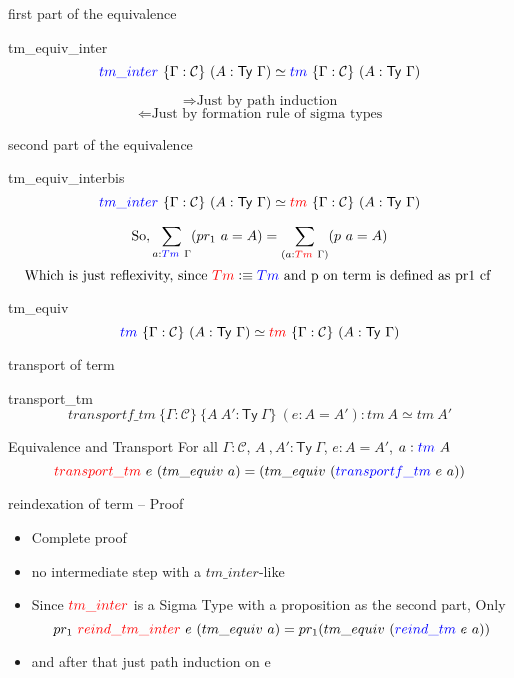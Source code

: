 \documentclass[
  ignorenonframetext,
  aspectratio=169,
  usenames,
  dvipsnames
]{beamer}
\newcommand{\constfont}[1]{\ensuremath{\mathsf{#1}}}
\newcommand{\CC}{{\mathcal{C}}}
\newcommand{\Ty}{\constfont{Ty}}
\newcommand{\rl}[1]{\color{red}#1\color{black}}
\newcommand{\bl}[1]{\color{blue}#1\color{black}}
\newcommand{\defeq}{\vcentcolon\equiv}
\begin{document}
\begin{frame}{first part of the equivalence}
  \begin{block}{tm\_equiv\_inter}
    $$\bl{tm\_inter}\ \{\Gamma : \CC\}\ (A : \Ty\ \Gamma) \simeq \bl{tm}\ \{\Gamma : \CC\}\ (A : \Ty\ \Gamma)$$
  \end{block}
  $$\Rightarrow \text{Just by path induction}$$
  $$\Leftarrow \text{Just by formation rule of sigma types}$$
\end{frame}
\begin{frame}{second part of the equivalence}
  \begin{block}{tm\_equiv\_interbis}
    $$\bl{tm\_inter}\ \{\Gamma : \CC\}\ (A : \Ty\ \Gamma) \simeq \rl{tm}\ \{\Gamma : \CC\}\ (A : \Ty\ \Gamma)$$
  \end{block}
  $$\text{So}, \sum_{a: \bl{Tm}\ \Gamma} (pr_1\ a = A) = \sum_{(a : \rl{Tm}\ \Gamma)} (p\ a = A) $$
  $$\text{Which is just reflexivity, since } \rl{Tm} \defeq \bl{Tm} \text{ and p on term is defined as pr1 cf } $$ 
  \begin{block}{tm\_equiv}
    $$\bl{tm}\ \{\Gamma : \CC\}\ (A : \Ty\ \Gamma) \simeq \rl{tm}\ \{\Gamma : \CC\}\ (A : \Ty\ \Gamma)$$
  \end{block}
\end{frame}

\begin{frame}{transport of term}
  \begin{block}{transport\_tm}
  $$transportf\_tm\ \{\Gamma :\CC\}\ \{A\ A': \Ty\ \Gamma\}\ (e  : A = A') : tm\ A \simeq tm\ A'$$
  \end{block}
  \begin{block}{Equivalence and Transport}
  For all $\Gamma : \CC$, $A\ ,A' : \Ty\ \Gamma$, $e : A = A'$, $a : \bl{tm}\ A$
  $$ \rl{transport\_tm}\ e\ (tm\_equiv\ a) = (tm\_equiv\ (\bl{transportf\_tm}\ e\ a))$$
  \end{block}
\end{frame}
\begin{frame}{reindexation of term -- Proof}
  \begin{itemize}
    \item Complete proof
    \item no intermediate step with a $tm\_inter$-like
    \item Since $\rl{tm\_inter}$ is a Sigma Type with a proposition as the second part, Only $$ pr_1\ \rl{reind\_tm\_inter}\ e\ (tm\_equiv\ a) =  pr_1 (tm\_equiv\ (\bl{reind\_tm}\ e\ a))$$
    \item and after that just path induction on e
\end{itemize}
\end{frame}
\end{document}
